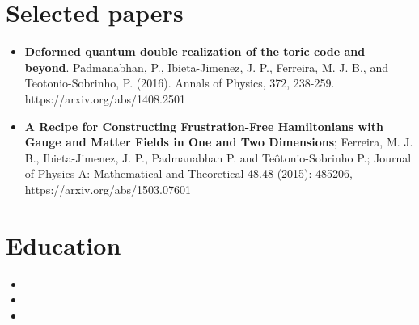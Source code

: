 \documentclass[11pt,a4paper,sans]{moderncv}        %
\begin{document}
\section{Selected papers}

\vspace{3pt}

\begin{itemize}
\item \textbf{Deformed quantum double realization of the toric code and beyond}. Padmanabhan, P., Ibieta-Jimenez, J. P., Ferreira, M. J. B., and Teotonio-Sobrinho, P. (2016). Annals of Physics, 372, 238-259. https://arxiv.org/abs/1408.2501
\vspace{1pt}
\item \textbf{A Recipe for Constructing Frustration-Free Hamiltonians with Gauge and Matter Fields in One and Two Dimensions}; Ferreira, M. J. B., Ibieta-Jimenez, J. P., Padmanabhan P.  and  Teôtonio-Sobrinho P.; Journal of Physics A: Mathematical and Theoretical 48.48 (2015): 485206, https://arxiv.org/abs/1503.07601
\end{itemize}

\section{Education}

\vspace{3pt}

\begin{itemize}

\item{}  %

\vspace{1pt}

\item{}

\vspace{1pt}


\item{}  %


\end{itemize}
\end{document}
